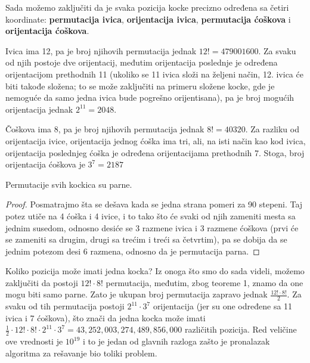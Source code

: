\documentclass[a4paper]{article}
\begin{document}
Sada možemo zaključiti da je svaka pozicija kocke precizno određena sa četiri koordinate: \textbf{permutacija ivica}, \textbf{orijentacija ivica}, \textbf{permutacija ćoškova} i \textbf{orijentacija ćoškova}.

Ivica ima 12, pa je broj njihovih permutacija jednak $12! = 479 001 600$. Za svaku od njih postoje dve orijentacij, međutim orijentacija poslednje je određena orijentacijom prethodnih 11 (ukoliko se 11 ivica složi na željeni način, 12. ivica će biti takođe složena; to se može zaključiti na primeru složene kocke, gde je nemoguće da samo jedna ivica bude pogrešno orijentisana), pa je broj mogućih orijentacija jednak $2^{11} = 2048$.

Čoškova ima 8, pa je broj njihovih permutacija jednak $8! = 40320$. Za razliku od orijentacija ivice, orijentacija jednog ćoška ima tri, ali, na isti način kao kod ivica, orijentacija poslednjeg ćoška je određena orijentacijama prethodnih 7. Stoga, broj orijentacija ćoškova je $3^{7} = 2187$

\begin{teorema} Permutacije svih kockica su parne.
\end{teorema}
\begin{proof}
    Posmatrajmo šta se dešava kada se jedna strana pomeri za 90 stepeni. Taj potez utiče na 4 ćoška i 4 ivice, i to tako što će svaki od njih zameniti mesta sa jednim susedom, odnosno desiće se 3 razmene ivica i 3 razmene ćoškova (prvi će se zameniti sa drugim, drugi sa trećim i treći sa četvrtim), pa se dobija da se jednim potezom desi 6 razmena, odnosno da je permutacija parna.
\end{proof}

Koliko pozicija može imati jedna kocka? Iz onoga što smo do sada videli, možemo zaključiti da postoji $12! \cdot 8!$ permutacija, međutim, zbog teoreme 1, znamo da one mogu biti samo parne. Zato je ukupan broj permutacija zapravo jednak $\frac{12! \cdot 8!}{2}$. Za svaku od tih permutacija postoji $2^{11} \cdot 3^{7}$ orijentacija (jer su one određene sa 11 ivica i 7 ćoškova), što znači da jedna kocka može imati $\frac{1}{2} \cdot 12! \cdot 8! \cdot 2^{11} \cdot 3^7 = 43,252,003,274,489,856,000$ različitih pozicija. Red veličine ove vrednosti je $10^{19}$ i to je jedan od glavnih razloga zašto je pronalazak algoritma za rešavanje bio toliki problem.
\end{document}
